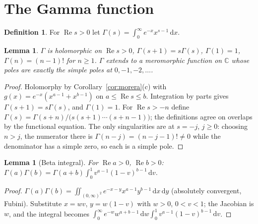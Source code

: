 \documentclass[11pt]{article}
\newtheorem{lemma}[theorem]{Lemma}
\theoremstyle{definition}
\newtheorem{definition}[theorem]{Definition}
\newcommand{\C}{\mathbb{C}}
\newcommand{\re}{\operatorname{Re}}
\newcommand{\dd}{\,\mathrm{d}}
\begin{document}
\section{The Gamma function}\label{sec:gamma}

\begin{definition}
For $\re s>0$ let $\Gamma(s)=\int_0^\infty e^{-x}x^{s-1}\dd x$.
\end{definition}

\begin{lemma}\label{lem:gamma-basic}
$\Gamma$ is holomorphic on $\re s>0$, $\Gamma(s+1)=s\Gamma(s)$, $\Gamma(1)=1$, $\Gamma(n)=(n-1)!$ for $n\ge1$.
$\Gamma$ extends to a meromorphic function on $\C$ whose poles are exactly the simple poles at $0,-1,-2,\dots$.
\end{lemma}
\begin{proof}
Holomorphy by Corollary~\ref{cor:morera}(c) with $g(x)=e^{-x}(x^{a-1}+x^{b-1})$ on $a\le\re s\le b$.
Integration by parts gives $\Gamma(s+1)=s\Gamma(s)$, and $\Gamma(1)=1$.
For $\re s>-n$ define $\Gamma(s)=\Gamma(s+n)/\bigl(s(s+1)\cdots(s+n-1)\bigr)$; the definitions agree on overlaps by the functional equation.
The only singularities are at $s=-j$, $j\ge0$: choosing $n>j$, the numerator there is $\Gamma(n-j)=(n-j-1)!\ne0$ while the denominator has a simple zero, so each is a simple pole.
\end{proof}

\begin{lemma}[Beta integral]\label{lem:beta}
For $\re a>0$, $\re b>0$:
$\displaystyle \Gamma(a)\Gamma(b)=\Gamma(a+b)\int_0^1 v^{a-1}(1-v)^{b-1}\dd v$.
\end{lemma}
\begin{proof}
$\Gamma(a)\Gamma(b)=\iint_{(0,\infty)^2}e^{-x-y}x^{a-1}y^{b-1}\dd x\dd y$ (absolutely convergent, Fubini).
Substitute $x=wv$, $y=w(1-v)$ with $w>0$, $0<v<1$; the Jacobian is $w$, and the integral becomes
$\int_0^\infty e^{-w}w^{a+b-1}\dd w\int_0^1 v^{a-1}(1-v)^{b-1}\dd v$.
\end{proof}
\end{document}
